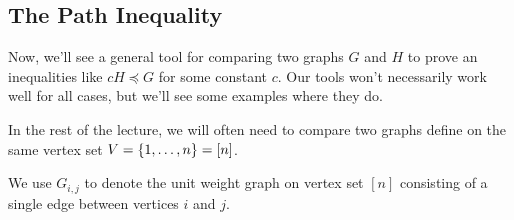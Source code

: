 


\subsection{The Path Inequality}
Now, we'll see a general tool
for comparing two graphs $G$ and $H$ to prove
an inequalities like $c H
\preceq G$ for some constant $c$.
Our tools won't necessarily work well for all cases, but we'll see
some examples where they do.


In the rest of the lecture, we will often need to compare two graphs
define on the same vertex set $V = \left\{1,\ldots,n \right\} = [n]$.

We use $G_{i,j}$ to denote the unit weight graph on vertex set $[n]$
consisting of a single edge between vertices $i$ and $j$.

